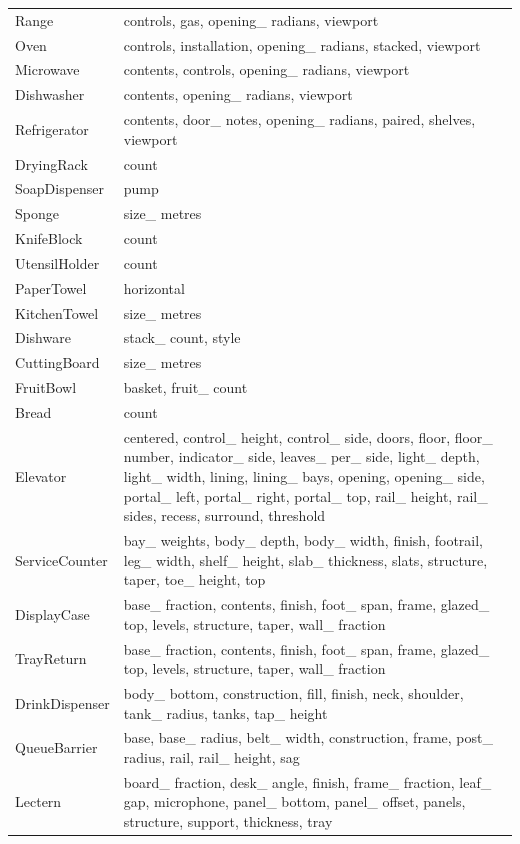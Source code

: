 \begin{longtable}{p{.20\linewidth}p{.74\linewidth}}
Range & controls, gas, opening\_ radians, viewport \\
Oven & controls, installation, opening\_ radians, stacked, viewport \\
Microwave & contents, controls, opening\_ radians, viewport \\
Dishwasher & contents, opening\_ radians, viewport \\
Refrigerator & contents, door\_ notes, opening\_ radians, paired, shelves, viewport \\
DryingRack & count \\
SoapDispenser & pump \\
Sponge & size\_ metres \\
KnifeBlock & count \\
UtensilHolder & count \\
PaperTowel & horizontal \\
KitchenTowel & size\_ metres \\
Dishware & stack\_ count, style \\
CuttingBoard & size\_ metres \\
FruitBowl & basket, fruit\_ count \\
Bread & count \\
Elevator & centered, control\_ height, control\_ side, doors, floor, floor\_ number, indicator\_ side, leaves\_ per\_ side, light\_ depth, light\_ width, lining, lining\_ bays, opening, opening\_ side, portal\_ left, portal\_ right, portal\_ top, rail\_ height, rail\_ sides, recess, surround, threshold \\
ServiceCounter & bay\_ weights, body\_ depth, body\_ width, finish, footrail, leg\_ width, shelf\_ height, slab\_ thickness, slats, structure, taper, toe\_ height, top \\
DisplayCase & base\_ fraction, contents, finish, foot\_ span, frame, glazed\_ top, levels, structure, taper, wall\_ fraction \\
TrayReturn & base\_ fraction, contents, finish, foot\_ span, frame, glazed\_ top, levels, structure, taper, wall\_ fraction \\
DrinkDispenser & body\_ bottom, construction, fill, finish, neck, shoulder, tank\_ radius, tanks, tap\_ height \\
QueueBarrier & base, base\_ radius, belt\_ width, construction, frame, post\_ radius, rail, rail\_ height, sag \\
Lectern & board\_ fraction, desk\_ angle, finish, frame\_ fraction, leaf\_ gap, microphone, panel\_ bottom, panel\_ offset, panels, structure, support, thickness, tray \\

\end{longtable}
